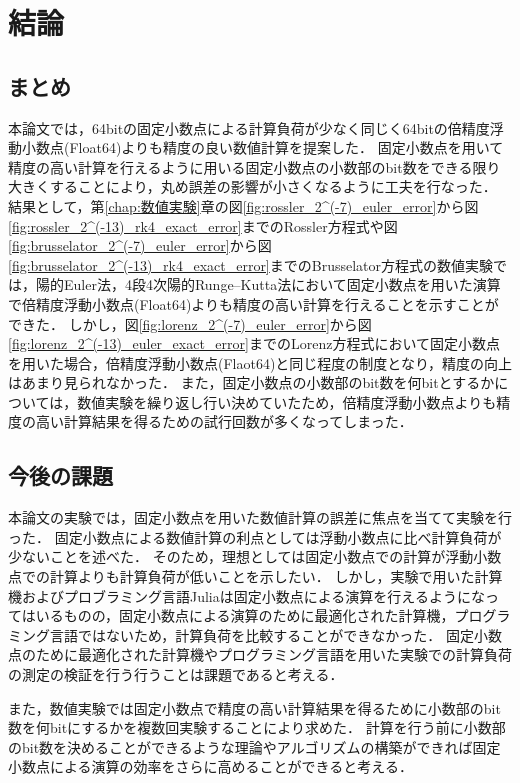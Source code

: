 \chapter{結論}
\label{chap:結論}
\section{まとめ}
本論文では，64bitの固定小数点による計算負荷が少なく同じく64bitの倍精度浮動小数点(Float64)よりも精度の良い数値計算を提案した．
固定小数点を用いて精度の高い計算を行えるように用いる固定小数点の小数部のbit数をできる限り大きくすることにより，丸め誤差の影響が小さくなるように工夫を行なった．
結果として，第\ref{chap:数値実験}章の図\ref{fig:rossler_2^(-7)_euler_error}から図\ref{fig:rossler_2^(-13)_rk4_exact_error}までのRossler方程式や図\ref{fig:brusselator_2^(-7)_euler_error}から図\ref{fig:brusselator_2^(-13)_rk4_exact_error}までのBrusselator方程式の数値実験では，陽的Euler法，4段4次陽的Runge--Kutta法において固定小数点を用いた演算で倍精度浮動小数点(Float64)よりも精度の高い計算を行えることを示すことができた．
しかし，図\ref{fig:lorenz_2^(-7)_euler_error}から図\ref{fig:lorenz_2^(-13)_euler_exact_error}までのLorenz方程式において固定小数点を用いた場合，倍精度浮動小数点(Flaot64)と同じ程度の制度となり，精度の向上はあまり見られなかった．
また，固定小数点の小数部のbit数を何bitとするかについては，数値実験を繰り返し行い決めていたため，倍精度浮動小数点よりも精度の高い計算結果を得るための試行回数が多くなってしまった．

\section{今後の課題}
本論文の実験では，固定小数点を用いた数値計算の誤差に焦点を当てて実験を行った．
固定小数点による数値計算の利点としては浮動小数点に比べ計算負荷が少ないことを述べた．
そのため，理想としては固定小数点での計算が浮動小数点での計算よりも計算負荷が低いことを示したい．
しかし，実験で用いた計算機およびプロブラミング言語Juliaは固定小数点による演算を行えるようになってはいるものの，固定小数点による演算のために最適化された計算機，プログラミング言語ではないため，計算負荷を比較することができなかった．
固定小数点のために最適化された計算機やプログラミング言語を用いた実験での計算負荷の測定の検証を行う行うことは課題であると考える．


また，数値実験では固定小数点で精度の高い計算結果を得るために小数部のbit数を何bitにするかを複数回実験することにより求めた．
計算を行う前に小数部のbit数を決めることができるような理論やアルゴリズムの構築ができれば固定小数点による演算の効率をさらに高めることができると考える．